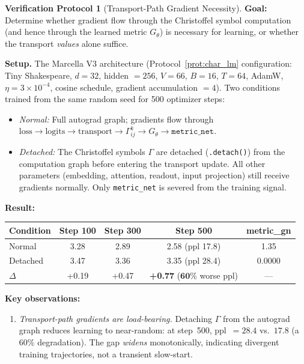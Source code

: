 \documentclass[11pt,a4paper]{article}
\theoremstyle{definition}
\newtheorem{protocol}[theorem]{Verification Protocol}
\theoremstyle{remark}
\begin{document}
\begin{protocol}[Transport-Path Gradient Necessity]%
\label{prot:gamma_detach}
\textbf{Goal:} Determine whether gradient flow through the 
Christoffel symbol computation (and hence through the learned 
metric $G_\theta$) is necessary for learning, or whether the 
transport \emph{values} alone suffice.

\textbf{Setup.} The Marcella V3 architecture 
(Protocol~\ref{prot:char_lm} configuration: Tiny Shakespeare, 
$d = 32$, hidden $= 256$, $V = 66$, $B = 16$, $T = 64$, 
AdamW, $\eta = 3 \times 10^{-4}$, cosine schedule, gradient 
accumulation $= 4$). Two conditions trained from the same 
random seed for 500 optimizer steps:
\begin{itemize}[nosep]
  \item \emph{Normal:} Full autograd graph; gradients flow 
  through $\text{loss} \to \text{logits} \to \text{transport} 
  \to \Gamma^k_{ij} \to G_\theta \to \texttt{metric\_net}$.
  \item \emph{Detached:} The Christoffel symbols $\Gamma$ are 
  detached (\texttt{.detach()}) from the computation graph 
  before entering the transport update.  All other parameters 
  (embedding, attention, readout, input projection) still 
  receive gradients normally.  Only \texttt{metric\_net} is 
  severed from the training signal.
\end{itemize}

\textbf{Result:}
\begin{center}
\begin{tabular}{lcccc}
\toprule
Condition & Step 100 & Step 300 & Step 500 & metric\_gn \\
\midrule
Normal    & 3.28 & 2.89 & 2.58 (ppl 17.8) & 1.35 \\
Detached  & 3.47 & 3.36 & 3.35 (ppl 28.4) & 0.0000 \\
\midrule
$\Delta$  & +0.19 & +0.47 & \textbf{+0.77} ($\mathbf{60\%}$ 
worse ppl) & --- \\
\bottomrule
\end{tabular}
\end{center}

\textbf{Key observations:}
\begin{enumerate}[nosep]
  \item \emph{Transport-path gradients are load-bearing.} 
  Detaching $\Gamma$ from the autograd graph reduces learning 
  to near-random: at step~500, ppl~$= 28.4$ vs.\ $17.8$ 
  (a $60\%$ degradation).  The gap \emph{widens} monotonically, 
  indicating divergent training trajectories, not a transient 
  slow-start.
  

\end{enumerate}
\end{protocol}
\end{document}

